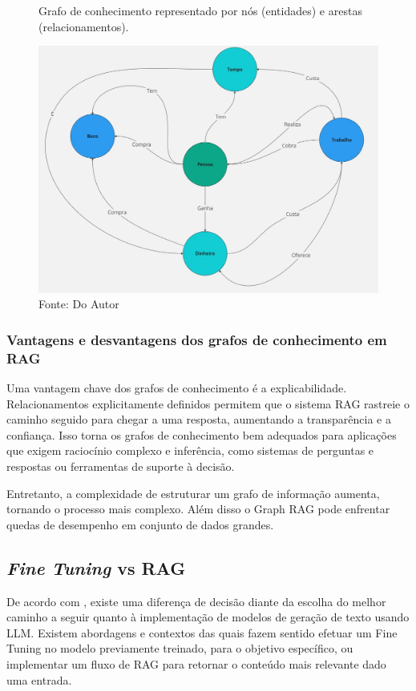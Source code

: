 \begin{figure}[H]
    \centering
      \caption{Grafo de conhecimento representado por nós (entidades) e arestas (relacionamentos).}
    \includegraphics[width=\linewidth]{img/rag5.jpg}
    \caption*{Fonte: Do Autor}
    \label{fig:rag5}
\end{figure}


\subsubsection{Vantagens e desvantagens dos grafos de conhecimento em RAG}
Uma vantagem chave dos grafos de conhecimento é a explicabilidade. Relacionamentos explicitamente definidos permitem que o sistema RAG rastreie o caminho seguido para chegar a uma resposta, aumentando a transparência e a confiança. Isso torna os grafos de conhecimento bem adequados para aplicações que exigem raciocínio complexo e inferência, como sistemas de perguntas e respostas ou ferramentas de suporte à decisão.

Entretanto, a complexidade de estruturar um grafo de informação aumenta, tornando o processo mais complexo. Além disso o Graph RAG pode enfrentar quedas de desempenho em conjunto de dados grandes.



\subsection{\textit{Fine Tuning} vs RAG}

De acordo com \cite{gao2024retrievalaugmentedgenerationlargelanguage}, existe uma diferença de decisão diante da escolha do melhor caminho a seguir quanto à implementação de modelos de geração de texto usando LLM. Existem abordagens e contextos das quais fazem sentido efetuar um Fine Tuning no modelo previamente treinado, para o objetivo específico, ou implementar um fluxo de RAG para retornar o conteúdo mais relevante dado uma entrada.

